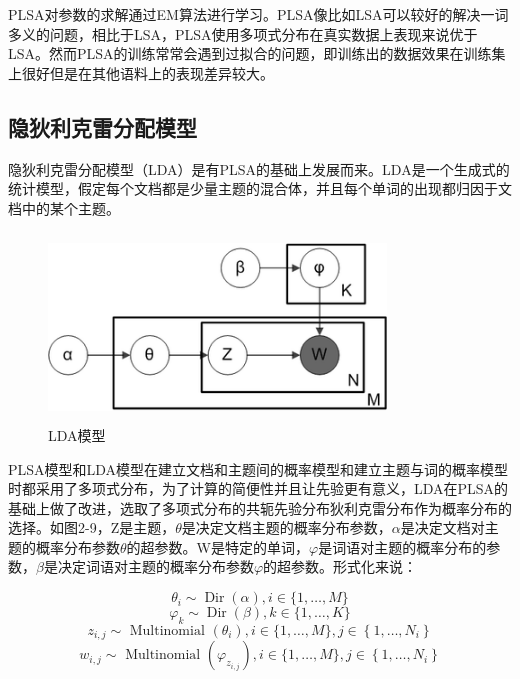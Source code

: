 \documentclass[winfonts,master,oneside,nobackinfo]{njuthesis}
\begin{document}
PLSA对参数的求解通过EM算法进行学习。PLSA像比如LSA可以较好的解决一词多义的问题，相比于LSA，PLSA使用多项式分布在真实数据上表现来说优于LSA。然而PLSA的训练常常会遇到过拟合的问题，即训练出的数据效果在训练集上很好但是在其他语料上的表现差异较大。

\subsection{隐狄利克雷分配模型}

隐狄利克雷分配模型（LDA）是有PLSA的基础上发展而来。LDA是一个生成式的统计模型，假定每个文档都是少量主题的混合体，并且每个单词的出现都归因于文档中的某个主题。

\begin{figure}[h]
\centering
\begin{minipage}[t]{\textwidth}
\includegraphics[width=0.8\textwidth,height=5.0cm]{./figure/lda.jpg}
\caption{LDA模型}
\label{lab:1}
\end{minipage}
\end{figure}

PLSA模型和LDA模型在建立文档和主题间的概率模型和建立主题与词的概率模型时都采用了多项式分布，为了计算的简便性并且让先验更有意义，LDA在PLSA的基础上做了改进，选取了多项式分布的共轭先验分布狄利克雷分布作为概率分布的选择。如图2-9，Z是主题，$\theta$是决定文档主题的概率分布参数，$\alpha$是决定文档对主题的概率分布参数$\theta$的超参数。W是特定的单词，$\varphi$是词语对主题的概率分布的参数，$\beta$是决定词语对主题的概率分布参数$\varphi$的超参数。形式化来说：

$$\theta _ { i } \sim \operatorname { Dir } ( \alpha ), i \in \{ 1 , \ldots , M \}$$
$$\varphi _ { k } \sim \operatorname { Dir } ( \beta ), k \in \{ 1 , \ldots , K \}$$
$$z _ { i , j } \sim \text { Multinomial } \left( \theta _ { i } \right), i \in \{ 1 , \ldots , M \},j \in \left\{ 1 , \ldots , N _ { i } \right\}$$
$$w _ { i , j } \sim \text { Multinomial } \left( \varphi _ { z _ { i , j } } \right), i \in \{ 1 , \ldots , M \},j \in \left\{ 1 , \ldots , N _ { i } \right\} $$
\end{document}
